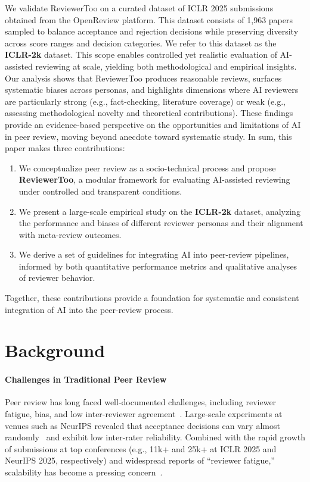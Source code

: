\documentclass{article} %
\newcommand{\shrink}[1][0.5]{\vspace{-#1\baselineskip}}
\begin{document}
We validate ReviewerToo on a curated dataset of ICLR 2025 submissions obtained from the OpenReview platform. This dataset consists of 1,963 papers sampled to balance acceptance and rejection decisions while preserving diversity across score ranges and decision categories. We refer to this dataset as the \textbf{ICLR-2k} dataset. This scope enables controlled yet realistic evaluation of AI-assisted reviewing at scale, yielding both methodological and empirical insights. Our analysis shows that ReviewerToo produces reasonable reviews, surfaces systematic biases across personas, and highlights dimensions where AI reviewers are particularly strong (e.g., fact-checking, literature coverage) or weak (e.g., assessing methodological novelty and theoretical contributions). These findings provide an evidence-based perspective on the opportunities and limitations of AI in peer review, moving beyond anecdote toward systematic study.
In sum, this paper makes three contributions:
\begin{enumerate}
    \item We conceptualize peer review as a socio-technical process and propose \textbf{ReviewerToo}, a modular framework for evaluating AI-assisted reviewing under controlled and transparent conditions.
    \item We present a large-scale empirical study on the \textbf{ICLR-2k} dataset, analyzing the performance and biases of different reviewer personas and their alignment with meta-review outcomes.
    \item We derive a set of guidelines for integrating AI into peer-review pipelines, informed by both quantitative performance metrics and qualitative analyses of reviewer behavior.
\end{enumerate}

Together, these contributions provide a foundation for systematic and consistent integration of AI into the peer-review process.

\section{Background}
\paragraph{Challenges in Traditional Peer Review} \shrink[0.75]
Peer review has long faced well-documented challenges, including reviewer fatigue, bias, and low inter-reviewer agreement~\citep{cortes2021inconsistency,adam2025peer}. Large-scale experiments at venues such as NeurIPS revealed that acceptance decisions can vary almost randomly~\citep{cortes2021inconsistency} and exhibit low inter-rater reliability.
Combined with the rapid growth of submissions at top conferences (e.g., 11k+ and 25k+ at ICLR 2025 and NeurIPS 2025, respectively) and widespread reports of ``reviewer fatigue,'' scalability has become a pressing concern~\citep{adam2025peer}.
\end{document}

